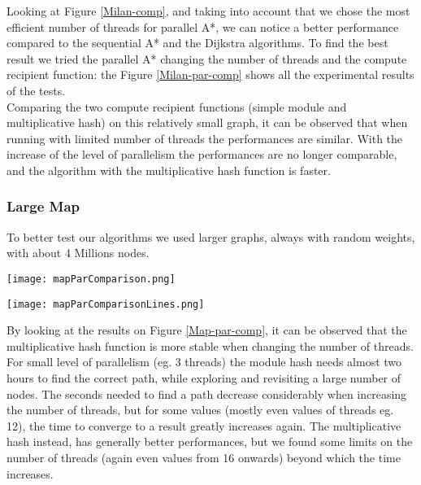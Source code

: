 Looking at Figure \ref{Milan-comp}, and taking into account that we chose the most efficient number of threads for parallel A*,
we can notice a better performance compared to the sequential A* and the Dijkstra algorithms. 
To find the best result we tried the parallel A* changing the number of threads and the compute recipient function:
the Figure \ref{Milan-par-comp} shows all the experimental results of the tests.
\\
Comparing the two compute recipient functions (simple module and multiplicative hash)
on this relatively small graph, it can be observed that when running with limited number of threads the performances are similar.
With the increase of the level of parallelism the performances are no longer comparable, and the algorithm with the multiplicative hash function is faster.


\subsubsection{Large Map}

To better test our algorithms we used larger graphs, always with random weights, with about 4 Millions nodes.

\vspace{0.5cm}

\begin{center} 
    \begin{minipage}[b]{0.5\textwidth}
            \centering
            \texttt{[image: mapParComparison.png]}
            \label{Map-par-comp}
        
    \end{minipage}%
    \hspace{1cm}
    \begin{minipage}[b]{0.4\textwidth}
            \centering
            \texttt{[image: mapParComparisonLines.png]}
            \label{Map-par-comp-lines}
    \end{minipage} 
\end{center}

\vspace{0.5cm}

By looking at the results on Figure \ref{Map-par-comp}, it can be observed that the multiplicative hash function is more stable when changing the number of threads.
For small level of parallelism (eg. 3 threads) the module hash needs almost two hours to find the correct path, while exploring and revisiting a large number of nodes.
The seconds needed to find a path decrease considerably when increasing the number of threads, but for some values (mostly even values of threads eg. 12), the time to converge to a result greatly increases again.
The multiplicative hash instead, has generally better performances, but we found some limits on the number of threads (again even values from 16 onwards) beyond which the time increases.


